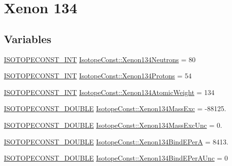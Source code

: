 \hypertarget{group___isotope_const-_xenon-_xe134}{}\section{Xenon 134}
\label{group___isotope_const-_xenon-_xe134}
\subsection*{Variables}
\begin{DoxyCompactItemize}
\item 
\mbox{\hyperlink{group___isotope_const-_macros_ga5f18360b3e99483a35c32d789e62621c}{I\+S\+O\+T\+O\+P\+E\+C\+O\+N\+S\+T\+\_\+\+I\+NT}} \mbox{\hyperlink{group___isotope_const-_xenon-_xe134_gaef70894683a6cb0cb64bd31b29c4fa16}{Isotope\+Const\+::\+Xenon134\+Neutrons}} = 80
\item 
\mbox{\hyperlink{group___isotope_const-_macros_ga5f18360b3e99483a35c32d789e62621c}{I\+S\+O\+T\+O\+P\+E\+C\+O\+N\+S\+T\+\_\+\+I\+NT}} \mbox{\hyperlink{group___isotope_const-_xenon-_xe134_gab265b0657dd46017d38ae4e370e127eb}{Isotope\+Const\+::\+Xenon134\+Protons}} = 54
\item 
\mbox{\hyperlink{group___isotope_const-_macros_ga5f18360b3e99483a35c32d789e62621c}{I\+S\+O\+T\+O\+P\+E\+C\+O\+N\+S\+T\+\_\+\+I\+NT}} \mbox{\hyperlink{group___isotope_const-_xenon-_xe134_gae8c80d7171e20a3effcfe5137f04a728}{Isotope\+Const\+::\+Xenon134\+Atomic\+Weight}} = 134
\item 
\mbox{\hyperlink{group___isotope_const-_macros_ga8f45a7272ce02c0b4c65c44636ed719a}{I\+S\+O\+T\+O\+P\+E\+C\+O\+N\+S\+T\+\_\+\+D\+O\+U\+B\+LE}} \mbox{\hyperlink{group___isotope_const-_xenon-_xe134_gac1867d1bcfc5cd650afdc1f7eb0e5e8a}{Isotope\+Const\+::\+Xenon134\+Mass\+Exc}} = -\/88125.
\item 
\mbox{\hyperlink{group___isotope_const-_macros_ga8f45a7272ce02c0b4c65c44636ed719a}{I\+S\+O\+T\+O\+P\+E\+C\+O\+N\+S\+T\+\_\+\+D\+O\+U\+B\+LE}} \mbox{\hyperlink{group___isotope_const-_xenon-_xe134_ga45884f87593d2e05705f9c98138455c9}{Isotope\+Const\+::\+Xenon134\+Mass\+Exc\+Unc}} = 0.
\item 
\mbox{\hyperlink{group___isotope_const-_macros_ga8f45a7272ce02c0b4c65c44636ed719a}{I\+S\+O\+T\+O\+P\+E\+C\+O\+N\+S\+T\+\_\+\+D\+O\+U\+B\+LE}} \mbox{\hyperlink{group___isotope_const-_xenon-_xe134_ga95e8a2681648706264fa93404b28fbb4}{Isotope\+Const\+::\+Xenon134\+Bind\+E\+PerA}} = 8413.
\item 
\mbox{\hyperlink{group___isotope_const-_macros_ga8f45a7272ce02c0b4c65c44636ed719a}{I\+S\+O\+T\+O\+P\+E\+C\+O\+N\+S\+T\+\_\+\+D\+O\+U\+B\+LE}} \mbox{\hyperlink{group___isotope_const-_xenon-_xe134_ga2f184774cd9291cd9e9d722cb2a08ef1}{Isotope\+Const\+::\+Xenon134\+Bind\+E\+Per\+A\+Unc}} = 0

\end{DoxyCompactItemize}
